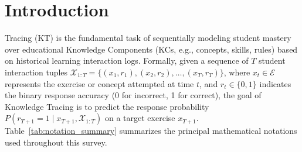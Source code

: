 \documentclass[10pt,journal,compsoc]{IEEEtran}
\begin{document}
\maketitle
\IEEEdisplaynontitleabstractindextext
\IEEEpeerreviewmaketitle

\section{Introduction}
 Tracing (KT) is the fundamental task of sequentially modeling student mastery over educational Knowledge Components (KCs, e.g., concepts, skills, rules) based on historical learning interaction logs. Formally, given a sequence of $T$ student interaction tuples $\mathcal{X}_{1:T} = \{(x_1, r_1), (x_2, r_2), \dots, (x_T, r_T)\}$, where $x_t \in \mathcal{E}$ represents the exercise or concept attempted at time $t$, and $r_t \in \{0, 1\}$ indicates the binary response accuracy (0 for incorrect, 1 for correct), the goal of Knowledge Tracing is to predict the response probability $P(r_{T+1} = 1 \mid x_{T+1}, \mathcal{X}_{1:T})$ on a target exercise $x_{T+1}$. Table~\ref{tab:notation_summary} summarizes the principal mathematical notations used throughout this survey.

\begin{table}[h]
\caption{Summary of Key Mathematical Notations}
\label{tab:notation_summary}
\centering
{}
\end{table}
\end{document}
